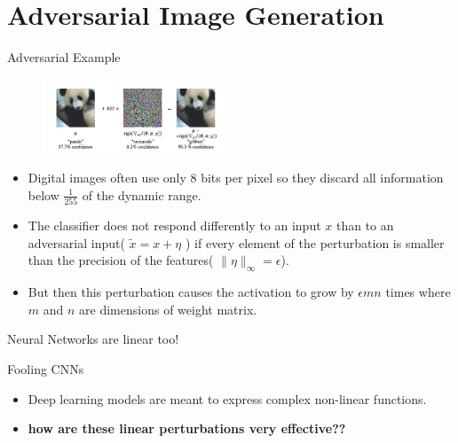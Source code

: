 \documentclass[10pt]{beamer}
\begin{document}
\section{Adversarial Image Generation}
\begin{frame}{Adversarial Example}
	\begin{figure}
		\includegraphics[width=0.5\textwidth]{panda-break}
	\end{figure}

\begin{itemize}
	\item Digital images often use only 8 bits per pixel so they discard all information below $\frac{1}{255}$ of the dynamic range.
	\item The classifier does not respond differently to an input $x$ than to an adversarial input( $\tilde{x} = x + \eta$ ) if every element of the perturbation is smaller than the precision of the features( $\|\eta \|_{\infty} = \epsilon$). 
	\item But then this perturbation causes the activation to grow by $\epsilon m n$ times where $m$ and $n$ are dimensions of weight matrix.
		
\end{itemize}
\end{frame}

\begin{frame}{Neural Networks are linear too!}
	\begin{alertblock}{Fooling CNNs}
	\begin{itemize}[<+- | alert@+>]
		\item Deep learning models are meant to express complex non-linear functions.
		\item \alert{\textbf{how are these linear perturbations very effective??}}
	\end{itemize}
	\end{alertblock}

\end{frame}
\end{document}
